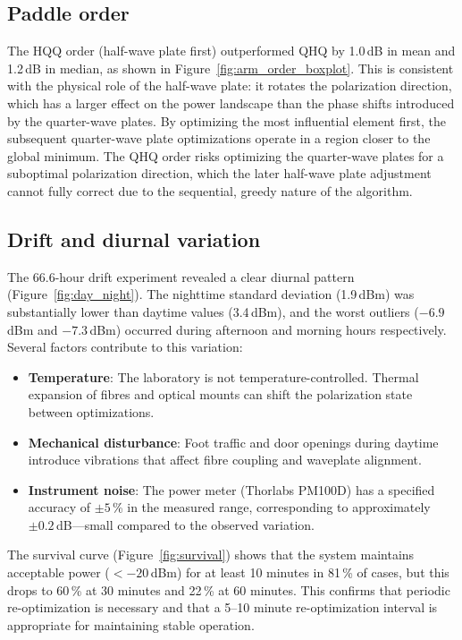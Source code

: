 \subsection{Paddle order}

The HQQ order (half-wave plate first) outperformed QHQ by 1.0\,dB in mean and 1.2\,dB in median, as shown in Figure~\ref{fig:arm_order_boxplot}. This is consistent with the physical role of the half-wave plate: it rotates the polarization direction, which has a larger effect on the power landscape than the phase shifts introduced by the quarter-wave plates. By optimizing the most influential element first, the subsequent quarter-wave plate optimizations operate in a region closer to the global minimum. The QHQ order risks optimizing the quarter-wave plates for a suboptimal polarization direction, which the later half-wave plate adjustment cannot fully correct due to the sequential, greedy nature of the algorithm.

\subsection{Drift and diurnal variation}

The 66.6-hour drift experiment revealed a clear diurnal pattern (Figure~\ref{fig:day_night}). The nighttime standard deviation (1.9\,dBm) was substantially lower than daytime values (3.4\,dBm), and the worst outliers ($-6.9$\,dBm and $-7.3$\,dBm) occurred during afternoon and morning hours respectively. Several factors contribute to this variation:

\begin{itemize}
    \item \textbf{Temperature}: The laboratory is not temperature-controlled. Thermal expansion of fibres and optical mounts can shift the polarization state between optimizations.
    \item \textbf{Mechanical disturbance}: Foot traffic and door openings during daytime introduce vibrations that affect fibre coupling and waveplate alignment.
    \item \textbf{Instrument noise}: The power meter (Thorlabs PM100D) has a specified accuracy of $\pm 5$\,\% in the measured range, corresponding to approximately $\pm 0.2$\,dB---small compared to the observed variation.
\end{itemize}

The survival curve (Figure~\ref{fig:survival}) shows that the system maintains acceptable power ($<{-20}$\,dBm) for at least 10 minutes in 81\,\% of cases, but this drops to 60\,\% at 30 minutes and 22\,\% at 60 minutes. This confirms that periodic re-optimization is necessary and that a 5--10 minute re-optimization interval is appropriate for maintaining stable operation.

